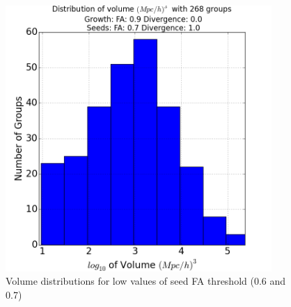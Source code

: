 \documentclass[12pt]{article}
\begin{document}
\begin{figure}[ht]
\begin{minipage}{.5\textwidth}
  \includegraphics[width=0.9\textwidth]{groups/volumeplots/volumes_distr_Mpc_07_Trace_10_search_FA_09_Trace_00.png}
\end{minipage}
\caption{Volume distributions for low values of seed FA threshold (0.6 and 0.7)}
\label{fg:volume_plots_lower}
\end{figure}
\FloatBarrier
\end{document}
